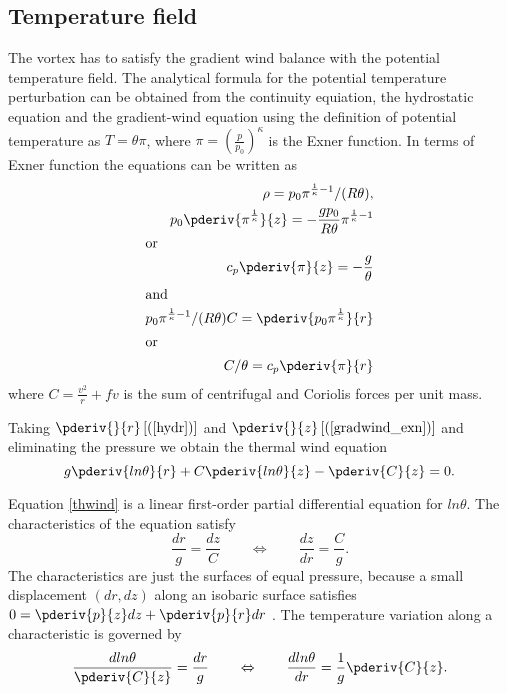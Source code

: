 \subsection{Temperature field}
The vortex has to satisfy the gradient wind balance with the potential temperature field. The analytical formula for the potential temperature perturbation can be obtained from the continuity equiation, the hydrostatic equation and the gradient-wind equation using the definition of potential temperature as $T=\theta\pi$, where $\pi=\left(\frac{p}{p_0}\right)^\kappa$ is the Exner function. In terms of Exner function the equations can be written as
\begin{align}
\rho=p_0\pi^{\frac{1}{\kappa}-1}/(R\theta),\label{cont} \\
p_0\pderiv{\pi^{\frac{1}{\kappa}}}{z}=-\frac{gp_0}{R\theta}\pi^{\frac{1}{\kappa}-1} \nonumber\\
\intertext{or}
c_p\pderiv{\pi}{z}=-\frac{g}{\theta} \label{hydr} \\
\intertext{and}
p_0\pi^{\frac{1}{\kappa}-1}/(R\theta)C=\pderiv{p_0\pi^{\frac{1}{\kappa}}}{r}\nonumber\\
\intertext{or}
C/\theta=c_p\pderiv{\pi}{r} \label{gradwind_exn}
\end{align}
where $C=\frac{v^2}{r}+fv$ is the sum of centrifugal and Coriolis forces per unit mass.

Taking $\pderiv{}{r}\left[(\ref{hydr})\right]$ and $\pderiv{}{z}\left[(\ref{gradwind_exn})\right]$ and eliminating the pressure we obtain the thermal wind equation
\begin{equation}
g\pderiv{ln\theta}{r}+C\pderiv{ln\theta}{z}-\pderiv{C}{z}=0. \label{thwind}
\end{equation}

Equation \ref{thwind} is a linear first-order partial differential equation for $ln\theta$. The characteristics of the equation satisfy
\begin{equation}
\frac{dr}{g}=\frac{dz}{C}\qquad\Leftrightarrow\qquad\frac{dz}{dr}=\frac{C}{g}. \label{char1}
\end{equation}
The characteristics are just the surfaces of equal pressure, because a small displacement $(dr,dz)$ along an isobaric surface satisfies $0=\pderiv{p}{z}dz+\pderiv{p}{r}dr$ \cite{Smith2006}. The temperature variation along a characteristic is governed by
\begin{equation}
\frac{dln\theta}{\pderiv{C}{z}}=\frac{dr}{g}\qquad\Leftrightarrow\qquad\frac{dln\theta}{dr}=\frac{1}{g}\pderiv{C}{z}. \label{char2}
\end{equation}

